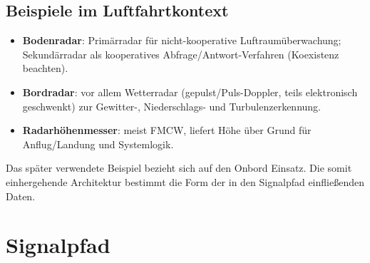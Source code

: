 \subsection{Beispiele im Luftfahrtkontext}

\begin{itemize}
  \item \textbf{Bodenradar}: Primärradar für nicht-kooperative Luftraumüberwachung; Sekundärradar als kooperatives Abfrage/Antwort-Verfahren (Koexistenz beachten).
  \item \textbf{Bordradar}: vor allem Wetterradar (gepulst/Puls-Doppler, teils elektronisch geschwenkt) zur Gewitter-, Niederschlags- und Turbulenzerkennung.
  \item \textbf{Radarhöhenmesser}: meist FMCW, liefert Höhe über Grund für Anflug/Landung und Systemlogik.
\end{itemize}

\medskip
Das später verwendete Beispiel bezieht sich auf den Onbord Einsatz. Die somit einhergehende Architektur bestimmt 
die Form der in den Signalpfad einfließenden Daten.


\section{Signalpfad}\label{sec:signalpfad}

 \usetikzlibrary{arrows.meta,positioning}

